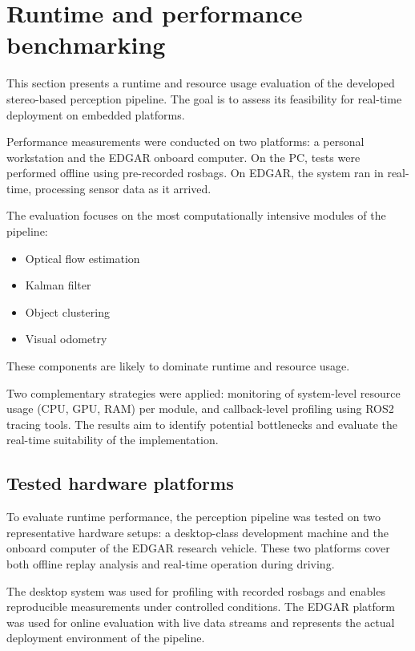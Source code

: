 \section{Runtime and performance benchmarking}\label{sec:PerformanceBenchmarking}

This section presents a runtime and resource usage evaluation of the
developed stereo-based perception pipeline. The goal is to assess its
feasibility for real-time deployment on embedded platforms.

Performance measurements were conducted on two platforms: a personal
workstation and the EDGAR onboard computer. On the PC, tests were
performed offline using pre-recorded rosbags. On EDGAR, the system
ran in real-time, processing sensor data as it arrived.

The evaluation focuses on the most computationally intensive modules
of the pipeline: 

\begin{itemize}
  \item Optical flow estimation
  \item Kalman filter
  \item Object clustering
  \item Visual odometry
\end{itemize}

These components are likely to dominate runtime and resource usage.

Two complementary strategies were applied: monitoring of system-level
resource usage (CPU, GPU, RAM) per module, and callback-level
profiling using ROS2 tracing tools. The results aim to identify
potential bottlenecks and evaluate the real-time suitability of the
implementation.

\subsection{Tested hardware platforms}\label{sec:HWPlatforms}

To evaluate runtime performance, the perception pipeline was tested 
on two representative hardware setups: a desktop-class development 
machine and the onboard computer of the EDGAR research vehicle. 
These two platforms cover both offline replay analysis and real-time 
operation during driving.

The desktop system was used for profiling with recorded rosbags 
and enables reproducible measurements under controlled conditions. 
The EDGAR platform was used for online evaluation with live data 
streams and represents the actual deployment environment of the 
pipeline.

